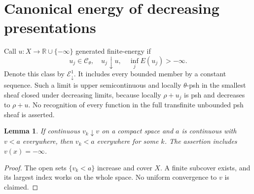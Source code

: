 \documentclass[11pt]{article}
\newtheorem{lemma}[theorem]{Lemma}
\newcommand{\R}{\mathbb R}
\begin{document}
\section{Canonical energy of decreasing presentations}
Call $u:X\to\R\cup\{-\infty\}$ generated finite-energy if
\[
                 u_j\in\mathcal C_\theta,\quad u_j\downarrow u,
                   \quad \inf_j E(u_j)>-\infty.
\]
Denote this class by $\mathcal E^1_{\downarrow}$.
It includes every bounded member by a constant sequence. Such a limit
is upper semicontinuous and locally $\theta$-psh in the smallest sheaf
closed under decreasing limits, because locally $\rho+u_j$ is psh and
decreases to $\rho+u$. No recognition of every function in the full
transfinite unbounded psh sheaf is asserted.

\begin{lemma}\label{lem:strict}
If continuous $v_k\downarrow v$ on a compact space and $a$ is
continuous with $v<a$ everywhere, then $v_k<a$ everywhere for some $k$.
The assertion includes $v(x)=-\infty$.
\end{lemma}
\begin{proof}
The open sets $\{v_k<a\}$ increase and cover $X$. A finite subcover
exists, and its largest index works on the whole space. No uniform
convergence to $v$ is claimed.
\end{proof}
\end{document}
